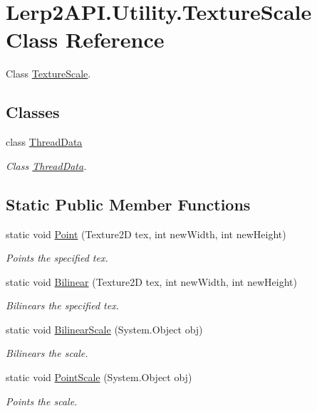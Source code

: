 \hypertarget{class_lerp2_a_p_i_1_1_utility_1_1_texture_scale}{}\section{Lerp2\+A\+P\+I.\+Utility.\+Texture\+Scale Class Reference}
\label{class_lerp2_a_p_i_1_1_utility_1_1_texture_scale}


Class \hyperlink{class_lerp2_a_p_i_1_1_utility_1_1_texture_scale}{Texture\+Scale}.  


\subsection*{Classes}
\begin{DoxyCompactItemize}
\item 
class \hyperlink{class_lerp2_a_p_i_1_1_utility_1_1_texture_scale_1_1_thread_data}{Thread\+Data}
\begin{DoxyCompactList}\small\item\em Class \hyperlink{class_lerp2_a_p_i_1_1_utility_1_1_texture_scale_1_1_thread_data}{Thread\+Data}. \end{DoxyCompactList}\end{DoxyCompactItemize}
\subsection*{Static Public Member Functions}
\begin{DoxyCompactItemize}
\item 
static void \hyperlink{class_lerp2_a_p_i_1_1_utility_1_1_texture_scale_ae1a7ff1fb6469b35ad24b4f15da9b75e}{Point} (Texture2D tex, int new\+Width, int new\+Height)
\begin{DoxyCompactList}\small\item\em Points the specified tex. \end{DoxyCompactList}\item 
static void \hyperlink{class_lerp2_a_p_i_1_1_utility_1_1_texture_scale_a569de17ba4a48d73610c712c4d97c2f6}{Bilinear} (Texture2D tex, int new\+Width, int new\+Height)
\begin{DoxyCompactList}\small\item\em Bilinears the specified tex. \end{DoxyCompactList}\item 
static void \hyperlink{class_lerp2_a_p_i_1_1_utility_1_1_texture_scale_aee123ab57c9b3f31bd7d02e0773193ba}{Bilinear\+Scale} (System.\+Object obj)
\begin{DoxyCompactList}\small\item\em Bilinears the scale. \end{DoxyCompactList}\item 
static void \hyperlink{class_lerp2_a_p_i_1_1_utility_1_1_texture_scale_ae076d34e049e9e4a7a035a4f73a1a633}{Point\+Scale} (System.\+Object obj)
\begin{DoxyCompactList}\small\item\em Points the scale. \end{DoxyCompactList}\end{DoxyCompactItemize}


